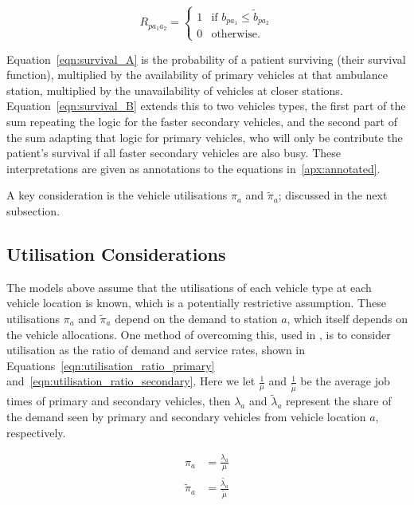 \documentclass[preprint,12pt]{elsarticle}
\begin{document}
\begin{equation}\label{eqn:R}
R_{p a_1 a_2} = \begin{cases}
    1 & \text{if } b_{p a_1} \leq \tilde{b}_{p a_2}\\
    0 & \text{otherwise.}
\end{cases}
\end{equation}

Equation~\ref{eqn:survival_A} is the probability of a patient surviving (their
survival function), multiplied by the availability of primary vehicles at that
ambulance station, multiplied by the unavailability of vehicles at closer
stations.
Equation~\ref{eqn:survival_B} extends this to two vehicles types, the first
part of the sum repeating the logic for the faster secondary vehicles, and the
second part of the sum adapting that logic for primary vehicles, who will only
be contribute the patient's survival if all faster secondary vehicles are also
busy. These interpretations are given as annotations to the equations
in~\ref{apx:annotated}.

A key consideration is the vehicle utilisations $\pi_a$ and $\tilde{\pi}_a$;
discussed in the next subsection.

\subsection{Utilisation Considerations}\label{sec:utilisation}
The models above assume that the utilisations of each vehicle type at each
vehicle location is known, which is a potentially restrictive assumption.
These utilisations $\pi_a$ and $\tilde{\pi}_a$ depend on the demand to station
$a$, which itself depends on the vehicle allocations. One method of overcoming
this, used in \cite{Knight2012918}, is to consider utilisation as the ratio of
demand and service rates, shown in Equations~\ref{eqn:utilisation_ratio_primary}
and~\ref{eqn:utilisation_ratio_secondary}. Here we let $\frac{1}{\mu}$ and
$\frac{1}{\tilde{\mu}}$ be the average job times of primary and secondary
vehicles, then $\lambda_a$ and $\tilde{\lambda}_a$ represent the share of the
demand seen by primary and secondary vehicles from vehicle location $a$,
respectively.

\begin{align}
\pi_a &= \frac{\lambda_a}{\mu} \label{eqn:utilisation_ratio_primary}\\
\tilde{\pi}_a &= \frac{\tilde{\lambda_a}}{\tilde{\mu}} \label{eqn:utilisation_ratio_secondary}
\end{align}
\end{document}
